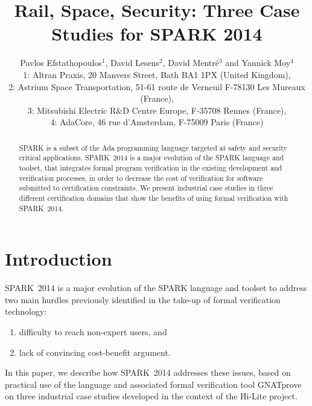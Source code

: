 \documentclass[10pt,a4paper,twocolumn]{article}
\newcommand{\hilite}{Hi-Lite\xspace}
\newcommand{\gnatprove}{GNATprove\xspace}
\newcommand{\newspark}{SPARK~2014\xspace}
\begin{document}
\title{Rail, Space, Security: Three Case Studies for SPARK 2014}

\author{%
\large Pavlos Efstathopoulos$^1$, David Lesens$^2$, David Mentré$^3$ and Yannick Moy$^4$\\
\normalsize 1: Altran Praxis, 20 Manvers Street, Bath BA1 1PX (United Kingdom),\\
\normalsize 2: Astrium Space Transportation, 51-61 route de Verneuil F-78130 Les Mureaux (France),\\
\normalsize 3: Mitsubishi Electric R\&D Centre Europe, F-35708 Rennes (France),\\
\normalsize 4: AdaCore, 46 rue d'Amsterdam, F-75009 Paris (France)}

\date{}

\maketitle

\begin{abstract}
SPARK is a subset of the Ada programming language targeted at safety and
security critical applications. \newspark is a major evolution of the SPARK
language and toolset, that integrates formal program verification in the
existing development and verification processes, in order to decrease the cost
of verification for software submitted to certification constraints. We present
industrial case studies in three different certification domains that show the
benefits of using formal verification with \newspark.
\end{abstract}

\section{Introduction}

\newspark is a major evolution of the SPARK language and toolset to address two
main hurdles previously identified in the take-up of formal verification
technology:
%
\begin{enumerate}
\item difficulty to reach non-expert users, and
\item lack of convincing cost-benefit argument.
\end{enumerate}

In this paper, we describe how \newspark addresses these issues, based on
practical use of the language and associated formal verification tool
\gnatprove on three industrial case studies developed in the context of the
\hilite project.
\end{document}

